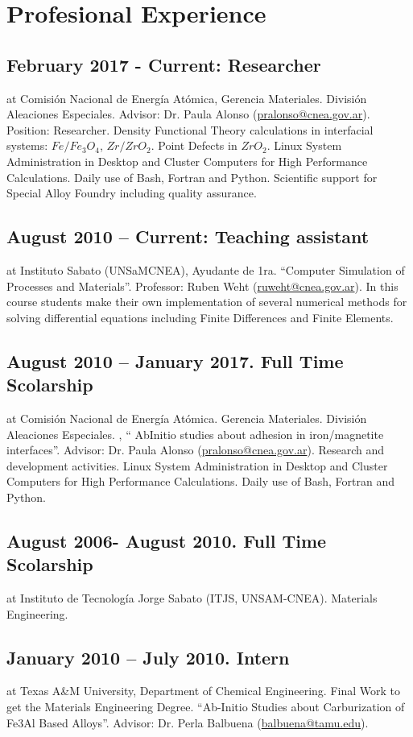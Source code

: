 \documentclass{my_cv}
\begin{document}
\section{Profesional Experience}

\subsection{February 2017 - Current: Researcher} at Comisión Nacional de Energía Atómica,  Gerencia Materiales. División Aleaciones Especiales. \textbf{} Advisor: Dr. Paula Alonso (\url{pralonso@cnea.gov.ar}). Position: Researcher. Density Functional Theory calculations in interfacial systems: $Fe / Fe_3O_4$, $Zr/ZrO_2$. Point Defects in $ZrO_2$. Linux System Administration in Desktop and Cluster Computers for High Performance Calculations. Daily use of Bash, Fortran and Python. Scientific support for Special Alloy Foundry including quality assurance.

\subsection{August 2010 – Current: Teaching assistant} at Instituto Sabato (UNSaM\-CNEA), Ayudante de 1ra. “Computer Simulation of Processes and Materials”. Professor: Ruben Weht (\url{ruweht@cnea.gov.ar}). In this course students make their own implementation of several numerical methods for solving differential equations including Finite Differences and Finite Elements.

\subsection{August 2010 – January 2017. Full Time Scolarship} at Comisión Nacional de Energía Atómica. Gerencia Materiales. División Aleaciones Especiales. , “ Ab\-Initio studies about adhesion in iron/magnetite interfaces”. Advisor: Dr. Paula Alonso (\url{pralonso@cnea.gov.ar}). Research and development activities. Linux System Administration in Desktop and Cluster Computers for High Performance Calculations. Daily use of Bash, Fortran and Python. 

\subsection{August 2006- August 2010. Full Time Scolarship } at Instituto de Tecnología Jorge Sabato (ITJS, UNSAM-CNEA). Materials Engineering. 

\subsection{January 2010 – July 2010. Intern } at Texas A\&M University, Department of Chemical Engineering. Final Work to get the Materials Engineering Degree. “Ab-Initio Studies about Carburization of Fe3Al Based Alloys”. Advisor: Dr. Perla Balbuena (\url{balbuena@tamu.edu}). 
\end{document}
